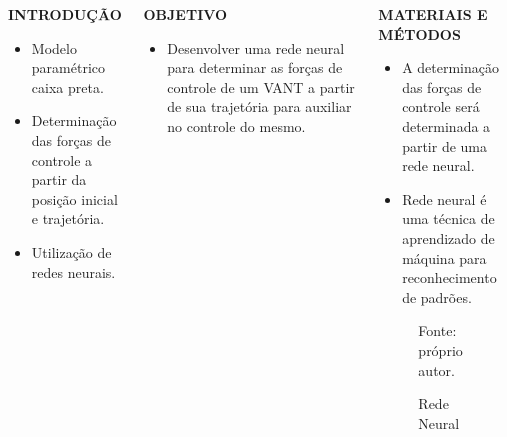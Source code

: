 \documentclass[serif,20pt]{beamer}
\begin{document}
\begin{frame}[t]
\begin{columns}[t]
\begin{block}{\centering\bfseries INTRODUÇÃO}
\vspace{1cm}
\begin{itemize}\justifying
    \item Modelo paramétrico caixa preta.
    \item Determinação das forças de controle a partir da posição inicial e trajetória.
    \item Utilização de redes neurais.
\end{itemize}
\vspace{1cm}
\end{block}
%
\begin{block}{\centering\bfseries OBJETIVO}\justifying
\vspace{1cm}
\begin{itemize}
    \item Desenvolver uma rede neural para determinar as forças de controle de um VANT a partir de sua trajetória para auxiliar no controle do mesmo.
\end{itemize}
\vspace{1cm}
\end{block}
%
\begin{block}{\centering\bfseries MATERIAIS E MÉTODOS}
    \vspace{1cm}
\begin{itemize}\justifying
    \item A determinação das forças de controle será determinada a partir de uma rede neural.
    \item Rede neural é uma técnica de aprendizado de máquina para reconhecimento de padrões.\cite{haykin1999}
\end{itemize}
%
\begin{figure}[H]
    \centering
    \caption{Rede Neural}
    

    {\footnotesize Fonte: próprio autor.}
    \label{fig:rede_neural}
\end{figure}


\end{block}
\end{columns}
\end{frame}
\end{document}
